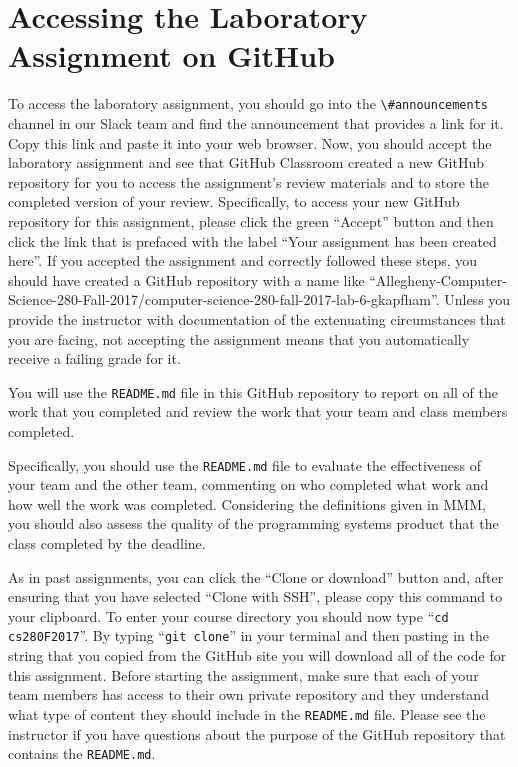 \documentclass[11pt]{article}
\newcommand{\reflection}{\lstinline{README.md}}
\newcommand{\command}[1]{``\lstinline{#1}''}
\newcommand{\channel}[1]{\lstinline{#1}}
\begin{document}
\section*{Accessing the Laboratory Assignment on GitHub}

To access the laboratory assignment, you should go into the \channel{\#announcements} channel in our Slack team and find
the announcement that provides a link for it. Copy this link and paste it into your web browser. Now, you should accept
the laboratory assignment and see that GitHub Classroom created a new GitHub repository for you to access the
assignment's review materials and to store the completed version of your review. Specifically, to access your new
GitHub repository for this assignment, please click the green ``Accept'' button and then click the link that is prefaced
with the label ``Your assignment has been created here''. If you accepted the assignment and correctly followed these
steps, you should have created a GitHub repository with a name like
``Allegheny-Computer-Science-280-Fall-2017/computer-science-280-fall-2017-lab-6-gkapfham''. Unless you provide the
instructor with documentation of the extenuating circumstances that you are facing, not accepting the assignment means
that you automatically receive a failing grade for it.

You will use the \reflection{} file in this GitHub repository to report on all of the work that you completed and review
the work that your team and class members completed.

Specifically, you should use the \reflection{} file to evaluate the
effectiveness of your team and the other team, commenting on who completed what work and how well the work was
completed. Considering the definitions given in MMM, you should also assess the quality of the programming systems
product that the class completed by the deadline.


As in past assignments, you can click the ``Clone or download'' button
and, after ensuring that you have selected ``Clone with SSH'', please copy this command to your clipboard. To enter your
course directory you should now type \command{cd cs280F2017}. By typing \command{git clone} in your terminal and then
pasting in the string that you copied from the GitHub site you will download all of the code for this assignment. Before
starting the assignment, make sure that each of your team members has access to their own private repository and they
understand what type of content they should include in the \reflection{} file. Please see the instructor if you have
questions about the purpose of the GitHub repository that contains the \reflection{}.
\end{document}
